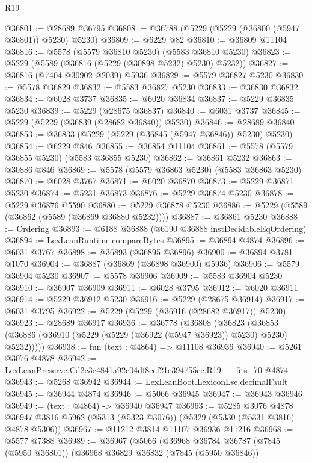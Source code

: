 \begin{lexlean}{R19}
\begin{coremodule}
@36801 := @28689 @36795
@36808 := @36788 (@5229 (@5229 (@36800 (@5947 @36801)) @5230) @5230)
@36809 := @6229 @82
@36810 := @36809 @11104
@36816 := @5578 (@5579 @36810 @5230) (@5583 @36810 @5230)
@36823 := @5229 (@5589 (@36816 (@5229 (@30898 @5232) @5230) @5232))
@36827 := @36816 (@7404 @30902 @2039) @5936
@36829 := @5579 @36827 @5230
@36830 := @5578 @36829
@36832 := @5583 @36827 @5230
@36833 := @36830 @36832
@36834 := @6028 @3737
@36835 := @6020 @36834
@36837 := @5229 @36835 @5230
@36839 := @5229 (@28675 @36837)
@36840 := @6031 @3737
@36845 := @5229 (@5229 (@36839 (@28682 @36840)) @5230)
@36846 := @28689 @36840
@36853 := @36833 (@5229 (@5229 (@36845 (@5947 @36846)) @5230) @5230)
@36854 := @6229 @846
@36855 := @36854 @11104
@36861 := @5578 (@5579 @36855 @5230) (@5583 @36855 @5230)
@36862 := @36861 @5232
@36863 := @30886 @846
@36869 := @5578 (@5579 @36863 @5230) (@5583 @36863 @5230)
@36870 := @6028 @3767
@36871 := @6020 @36870
@36873 := @5229 @36871 @5230
@36874 := @5231 @36873
@36876 := @5229 @36874 @5230
@36878 := @5229 @36876 @5590
@36880 := @5229 @36878 @5230
@36886 := @5229 (@5589 (@36862 (@5589 (@36869 @36880 @5232))))
@36887 := @36861 @5230
@36888 := Ordering
@36893 := @6188 @36888 (@6190 @36888 instDecidableEqOrdering)
@36894 := LexLeanRuntime.compareBytes
@36895 := @36894 @4874
@36896 := @6031 @3767
@36898 := @36893 (@36895 @36896)
@36900 := @36894 @3781 @1070
@36904 := @36887 (@36869 (@36898 @36900) @5936)
@36906 := @5579 @36904 @5230
@36907 := @5578 @36906
@36909 := @5583 @36904 @5230
@36910 := @36907 @36909
@36911 := @6028 @3795
@36912 := @6020 @36911
@36914 := @5229 @36912 @5230
@36916 := @5229 (@28675 @36914)
@36917 := @6031 @3795
@36922 := @5229 (@5229 (@36916 (@28682 @36917)) @5230)
@36923 := @28689 @36917
@36936 := @36778
    (@36808
      (@36823 (@36853 (@36886 (@36910 (@5229 (@5229 (@36922 (@5947 @36923)) @5230) @5230) @5232)))))
@36938 := fun (text : @4864) => @11108 @36936
@36940 := @5261 @3076 @4878
@36942 := LexLeanPreserve.Cd2c3e4841a92e04df8eef21e394755ce.R19.__fits_70 @4874
@36943 := @5268 @36942
@36944 := LexLeanBoot.LexiconLse.decimalFault
@36945 := @36944 @4874
@36946 := @5066 @36945
@36947 := @36943 @36946
@36949 := (text : @4864) -> @36940 @36947
@36963 := @5285
    @3076
    @4878
    @36947
    @3816
    @5962
    (@5313 (@5323 @3076))
    (@5329 (@5330 (@5331 @3816) @4878 @5306))
@36967 := @11212 @3814 @11107 @36936 @11216
@36968 := @5577 @7388
@36989 := @36967
    (@5066
      (@36968
        @36784
        @36787
        (@7845 (@5950 @36801))
        (@36968
          @36829
          @36832
          (@7845 (@5950 @36846))

\end{coremodule}
\end{lexlean}
